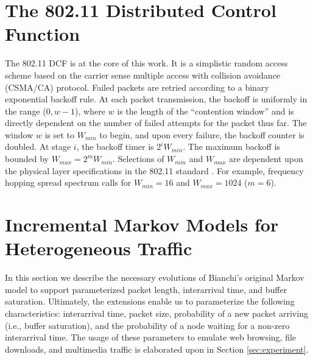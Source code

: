 \documentclass{llncs}
\begin{document}
\section{The 802.11 Distributed Control Function}
The 802.11 DCF \cite{ieee1997wireless} is at the core of this work. It is a simplistic random access scheme based on the carrier sense multiple access with collision avoidance (CSMA/CA) protocol. Failed packets are retried according to a binary exponential backoff rule. At each packet transmission, the backoff is uniformly in the range ($0, w-1$), where $w$ is the length of the ``contention window'' and is directly dependent on the number of failed attempts for the packet thus far. The window $w$ is set to $W_{min}$ to begin, and upon every failure, the backoff counter is doubled. At stage $i$, the backoff timer is $2^iW_{min}$. The maximum backoff is bounded by $W_{max} = 2^mW_{min}$. Selections of $W_{min}$ and $W_{max}$ are dependent upon the physical layer specifications in the 802.11 standard \cite{ieee1997wireless,dcf}. For example, frequency hopping spread spectrum calls for $W_{min} = 16$ and $W_{max} = 1024$ ($m = 6$). 

\section{Incremental Markov Models for Heterogeneous Traffic}
In this section we describe the necessary evolutions of Bianchi's original Markov model to support parameterized packet length, interarrival time, and buffer saturation. Ultimately, the extensions enable us to parameterize the following characteristics: interarrival time, packet size, probability of a new packet arriving (i.e., buffer saturation), and the probability of a node waiting for a non-zero interarrival time. The usage of these parameters to emulate web browsing, file downloads, and multimedia traffic is elaborated upon in Section \ref{sec:experiment}.
\end{document}
